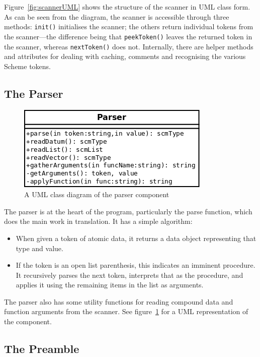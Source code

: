 Figure~\ref{fig:scannerUML} shows the structure of the scanner in UML class
form. As can be seen from the diagram, the scanner is accessible through three
methods: \texttt{init()} initialises the scanner; the others return individual
tokens from the scanner---the difference being that \texttt{peekToken()} leaves
the returned token in the scanner, whereas \texttt{nextToken()} does not.
Internally, there are helper methods and attributes for dealing with caching,
comments and recognising the various Scheme tokens.

\subsection{The Parser}

\begin{figure}
\centering
\includegraphics[width=\textwidth]{parserUML.png}
\caption{A UML class diagram of the parser component}
\label{fig:parserUML}
\end{figure}

The parser is at the heart of the program, particularly the parse function,
which does the main work in translation. It has a simple algorithm:
\begin{itemize}
\item When given a token of atomic data, it returns a data object representing
that type and value.
\item If the token is an open list parenthesis, this indicates an imminent
procedure. It recursively parses the next token, interprets that as the
procedure, and applies it using the remaining items in the list as arguments.
\end{itemize}
The parser also has some utility functions for reading compound data and
function arguments from the scanner. See figure~\ref{fig:parserUML} for a UML
representation of the component.

\subsection{The Preamble}

